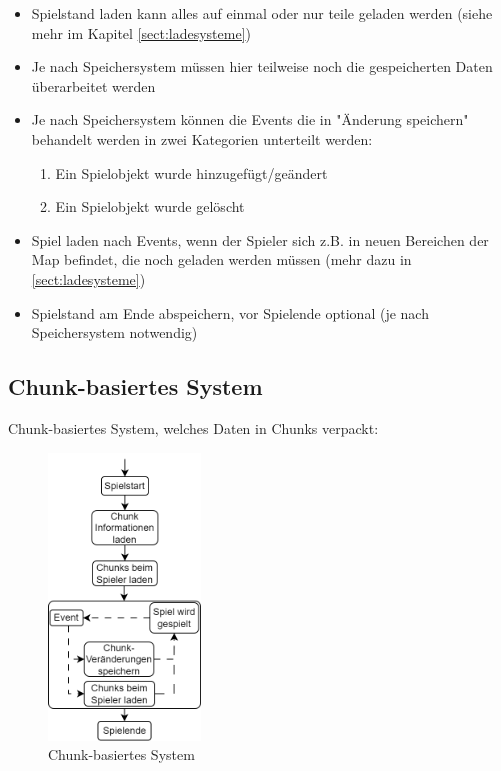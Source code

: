 \begin{itemize}
    \item Spielstand laden kann alles auf einmal oder nur teile geladen werden (siehe mehr im Kapitel \ref{sect:ladesysteme})
    \item Je nach Speichersystem müssen hier teilweise noch die gespeicherten Daten überarbeitet werden
    \item Je nach Speichersystem können die Events die in "Änderung speichern" behandelt werden in zwei Kategorien unterteilt werden:
    \begin{enumerate}
        \item Ein Spielobjekt wurde hinzugefügt/geändert
        \item Ein Spielobjekt wurde gelöscht
    \end{enumerate}
    \item Spiel laden nach Events, wenn der Spieler sich z.B. in neuen Bereichen der Map befindet, die noch geladen werden müssen (mehr dazu in \ref{sect:ladesysteme})
    \item Spielstand am Ende abspeichern, vor Spielende optional (je nach Speichersystem notwendig)
\end{itemize}


\subsection{Chunk-basiertes System}
Chunk-basiertes System, welches Daten in Chunks verpackt:
\begin{figure}[htp]
    \centering
    \includegraphics[width=0.36\textwidth]{images/Chunkbasiert.png}
    \caption{Chunk-basiertes System}
    \label{fig:chunkBasedSystem}
\end{figure}

